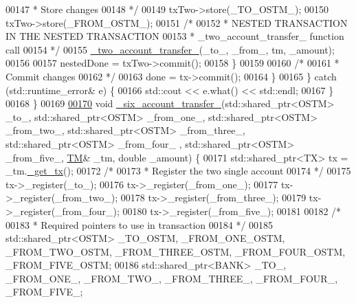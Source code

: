 \begin{DoxyCode}
00147 \textcolor{comment}{                 * Store changes}
00148 \textcolor{comment}{                 */}
00149                 txTwo->store(\_TO\_OSTM\_);
00150                 txTwo->store(\_FROM\_OSTM\_);
00151                 \textcolor{comment}{/*}
00152 \textcolor{comment}{                 * NESTED TRANSACTION IN THE NESTED TRANSACTION}
00153 \textcolor{comment}{                 * \_two\_account\_transfer\_ function call}
00154 \textcolor{comment}{                 */}
00155                 \hyperlink{classclient_a71edd1265ba9ae03f71b5dbf54548696_a71edd1265ba9ae03f71b5dbf54548696}{\_two\_account\_transfer\_}(\_to\_, \_from\_, tm, \_amount);
00156 
00157                 nestedDone = txTwo->commit();
00158             \}
00159 
00160             \textcolor{comment}{/*}
00161 \textcolor{comment}{             * Commit changes}
00162 \textcolor{comment}{             */}
00163             done = tx->commit();
00164         \}
00165     \} \textcolor{keywordflow}{catch} (std::runtime\_error& e) \{
00166         std::cout << e.what() << std::endl;
00167     \}
00168 \}
00169 
\hypertarget{client_8h_source.tex_l00170}{}\hyperlink{classclient_a94fb0b42124860568a011ed94f8bc9d5_a94fb0b42124860568a011ed94f8bc9d5}{00170} \textcolor{keywordtype}{void} \hyperlink{classclient_a94fb0b42124860568a011ed94f8bc9d5_a94fb0b42124860568a011ed94f8bc9d5}{\_six\_account\_transfer\_}(std::shared\_ptr<OSTM> \_to\_, std::shared\_ptr<OSTM> 
      \_from\_one\_, std::shared\_ptr<OSTM> \_from\_two\_, std::shared\_ptr<OSTM> \_from\_three\_, std::shared\_ptr<OSTM> \_from\_four\_
      , std::shared\_ptr<OSTM> \_from\_five\_, \hyperlink{class_t_m}{TM}& \_tm, \textcolor{keywordtype}{double} \_amount) \{
00171     std::shared\_ptr<TX> tx = \_tm.\hyperlink{class_t_m_a41cb0226cc4080c931651b13f74a0075_a41cb0226cc4080c931651b13f74a0075}{\_get\_tx}();
00172     \textcolor{comment}{/*}
00173 \textcolor{comment}{     * Register the two single account}
00174 \textcolor{comment}{     */}
00175     tx->\_register(\_to\_);
00176     tx->\_register(\_from\_one\_);
00177     tx->\_register(\_from\_two\_);
00178     tx->\_register(\_from\_three\_);
00179     tx->\_register(\_from\_four\_);
00180     tx->\_register(\_from\_five\_);
00181 
00182     \textcolor{comment}{/*}
00183 \textcolor{comment}{     * Required pointers to use in transaction}
00184 \textcolor{comment}{     */}
00185     std::shared\_ptr<OSTM> \_TO\_OSTM, \_FROM\_ONE\_OSTM, \_FROM\_TWO\_OSTM, \_FROM\_THREE\_OSTM, \_FROM\_FOUR\_OSTM, 
      \_FROM\_FIVE\_OSTM;
00186     std::shared\_ptr<BANK> \_TO\_, \_FROM\_ONE\_, \_FROM\_TWO\_, \_FROM\_THREE\_, \_FROM\_FOUR\_, \_FROM\_FIVE\_;

\end{DoxyCode}
